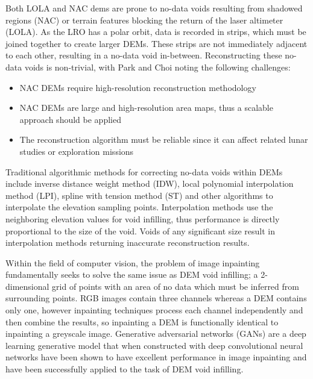 \documentclass[twocolumn]{article}
\begin{document}
Both LOLA and NAC dems are prone to no-data voids resulting from shadowed regions (NAC) or terrain features blocking the return of the laser altimeter (LOLA).
As the LRO has a polar orbit, data is recorded in strips, which must be joined together to create larger DEMs. These strips are not immediately adjacent to each other, resulting in a no-data void in-between.
Reconstructing these no-data voids is non-trivial, with Park and Choi \autocite{parkNeuralProcessApproach2021}  noting the following challenges:
\begin{itemize}
\item NAC DEMs require high-resolution reconstruction methodology
\item NAC DEMs are large and high-resolution area maps, thus a scalable approach should be applied
\item The reconstruction algorithm must be reliable since it can affect related lunar studies or exploration missions
\end{itemize}

Traditional algorithmic methods for correcting no-data voids within DEMs include inverse distance weight method (IDW), local polynomial interpolation method (LPI), spline with tension method (ST) and other algorithms to interpolate the elevation sampling points. Interpolation methods use the neighboring elevation values for void infilling, thus performance is directly proportional to the size of the void.
Voids of any significant size result in interpolation methods returning inaccurate reconstruction results.  \autocite{reuterEvaluationVoidFilling2007}

Within the field of computer vision, the problem of image inpainting fundamentally seeks to solve the same issue as DEM void infilling; a 2-dimensional grid of points with an area of no data which must be inferred from surrounding points.
RGB images contain three channels whereas a DEM contains only one, however inpainting techniques process each channel independently and then combine the results, so inpainting a DEM is functionally identical to inpainting a greyscale image.
Generative adversarial networks (GANs)\autocite{goodfellowGenerativeAdversarialNetworks2020} are a deep learning generative model that when constructed with deep convolutional neural networks\autocite{krizhevskyImageNetClassificationDeep2017} have been shown to have excellent performance in image inpainting\autocite{pathakContextEncodersFeature2016,yuGenerativeImageInpainting2018} and have been successfully applied to the task of DEM void infilling\autocite{gavriilVoidFillingDigital2019,zhangVoidFillingBased2020,qiuVoidFillingDigital2019}.
\end{document}
